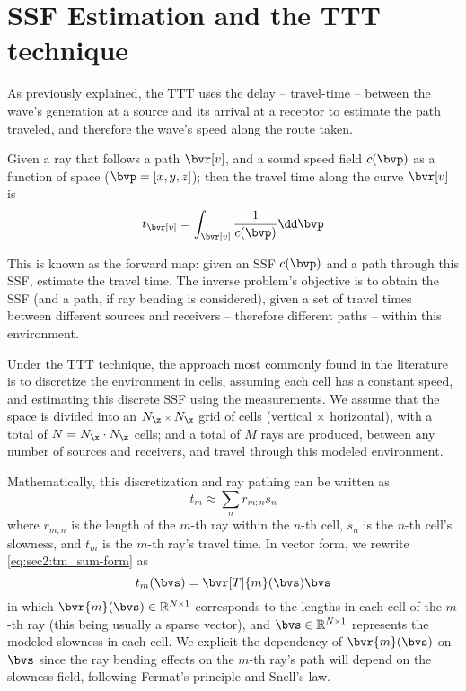 \section{SSF Estimation and the TTT technique}
\label{sec:ssf_estimation}
As previously explained, the TTT uses the delay -- travel-time -- between the wave's generation at a source and its arrival at a receptor to estimate the path traveled, and therefore the wave's speed along the route taken.

Given a ray that follows a path $\bvr[v]$, and a sound speed field $c(\bvp)$ as a function of space ($\bvp=[x,y,z]$); then the travel time along the curve $\bvr[v]$ is
\begin{equation}
	t_{\bvr[v]} = \int_{\bvr[v]} \frac{1}{c(\bvp)} \dd \bvp
\end{equation}

This is known as the forward map: given an SSF $c(\bvp)$ and a path through this SSF, estimate the travel time. The inverse problem's objective is to obtain the SSF (and a path, if ray bending is considered), given a set of travel times between different sources and receivers -- therefore different paths -- within this environment.

Under the TTT technique, the approach most commonly found in the literature is to discretize the environment in cells, assuming each cell has a constant speed, and estimating this discrete SSF using the measurements. We assume that the space is divided into an $\sz{N_{\z}}{N_{\x}}$ grid of cells (vertical $\times$ horizontal), with a total of $N = N_{\x} \cdot N_{\z}$ cells; and a total of $M$ rays are produced, between any number of sources and receivers, and travel through this modeled environment.

Mathematically, this discretization and ray pathing can be written as
\begin{equation}
	t_{m} \approx \sum_{n} r_{m;n} s_n
	\label{eq:sec2:tm_sum-form}
\end{equation}
where $r_{m;n}$ is the length of the $m$-th ray within the $n$-th cell, $s_n$ is the $n$-th cell's slowness, and $t_m$ is the $m$-th ray's travel time. In vector form, we rewrite \cref{eq:sec2:tm_sum-form} as
\begin{equation}
	t_m(\bvs) = \bvr[T]{m}(\bvs) \bvs
\end{equation}
in which $\bvr{m}(\bvs) \in \re^{\sz{N}{1}}$ corresponds to the lengths in each cell of the $m$-th ray (this being usually a sparse vector), and $\bvs \in \re^{\sz{N}{1}}$ represents the modeled slowness in each cell. We explicit the dependency of $\bvr{m}(\bvs)$ on $\bvs$ since the ray bending effects on the $m$-th ray's path will depend on the slowness field, following Fermat's principle and Snell's law.

